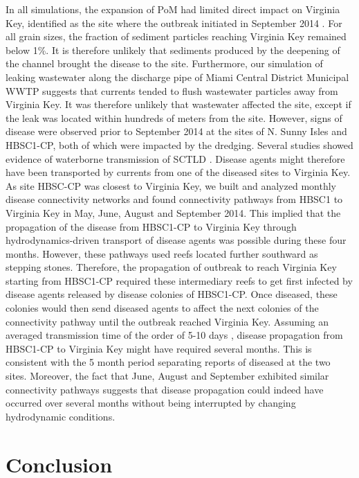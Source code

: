 \documentclass[preprint,12pt,authoryear]{elsarticle}
\begin{document}
In all simulations, the expansion of PoM had limited direct impact on Virginia Key, identified as the site where the outbreak initiated in September 2014 \cite{precht2016unprecedented}. For all grain sizes, the fraction of sediment particles reaching Virginia Key remained below 1\%. It is therefore unlikely that sediments produced by the deepening of the channel brought the disease to the site. Furthermore, our simulation of leaking wastewater along the discharge pipe of Miami Central District Municipal WWTP suggests that currents tended to flush wastewater particles away from Virginia Key. It was therefore unlikely that wastewater affected the site, except if the leak was located within hundreds of meters from the site. However, signs of disease were observed prior to September 2014 at the sites of N. Sunny Isles and HBSC1-CP, both of which were impacted by the dredging. Several studies showed evidence of waterborne transmission of SCTLD \citep{aeby2019pathogenesis,dobbelaere2020coupled,eaton2021measuring,meiling2021variable}. Disease agents might therefore have been transported by currents from one of the diseased sites to Virginia Key. As site HBSC-CP was closest to Virginia Key, we built and analyzed monthly disease connectivity networks and found connectivity pathways from HBSC1 to Virginia Key in May, June, August and September 2014. This implied that the propagation of the disease from HBSC1-CP to Virginia Key through hydrodynamics-driven transport of disease agents was possible during these four months. However, these pathways used reefs located further southward as stepping stones. Therefore, the propagation of outbreak to reach Virginia Key starting from HBSC1-CP required these intermediary reefs to get first infected by disease agents released by disease colonies of HBSC1-CP. Once diseased, these colonies would then send diseased agents to affect the next colonies of the connectivity pathway until the outbreak reached Virginia Key. Assuming an averaged transmission time of the order of 5-10 days \citep{dobbelaere2020coupled}, disease propagation from HBSC1-CP to Virginia Key might have required several months. This is consistent with the 5 month period separating reports of diseased at the two sites. Moreover, the fact that June, August and September exhibited similar connectivity pathways suggests that disease propagation could indeed have occurred over several months without being interrupted by changing hydrodynamic conditions.

\section{Conclusion}
\end{document}
